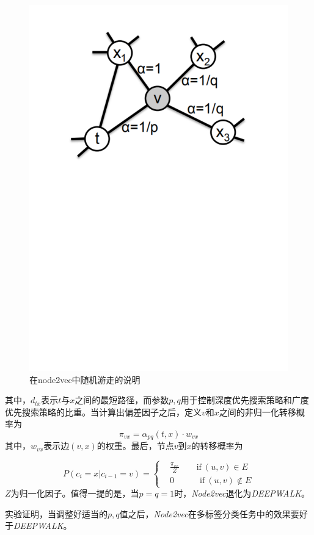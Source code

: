 \begin{figure}[!htbp]
	\centering
	\includegraphics[scale=0.8]{Fig/Node2Vec_2.pdf}
	\caption{在node2vec中随机游走的说明\cite{grover2016node2vec}}
	\label{fig:node2vec2}
\end{figure}
其中，$d_{tx}$表示$t$与$x$之间的最短路径，而参数$p,q$用于控制深度优先搜索策略和广度优先搜索策略的比重。当计算出偏差因子之后，定义$v$和$x$之间的非归一化转移概率为
\[\pi_{vx} = \alpha_{pq}(t, x)\cdot w_{vx}\]
其中，$w_{vx}$表示边$(v, x)$的权重。最后，节点$v$到$x$的转移概率为

\[ P(c_i=x|c_{i-1}=v)=\begin{cases} & \frac{\pi_{vx}}{Z}\qquad \text{if}\ (u, v) \in E\\
& 0 \qquad\quad  \text{if}\ (u, v) \notin E\end{cases}\]
$Z$为归一化因子。值得一提的是，当$p=q=1$时，\emph{Node2vec}退化为\emph{DEEPWALK}。

实验证明，当调整好适当的$p,q$值之后，\emph{Node2vec}在多标签分类任务中的效果要好于\emph{DEEPWALK}。
